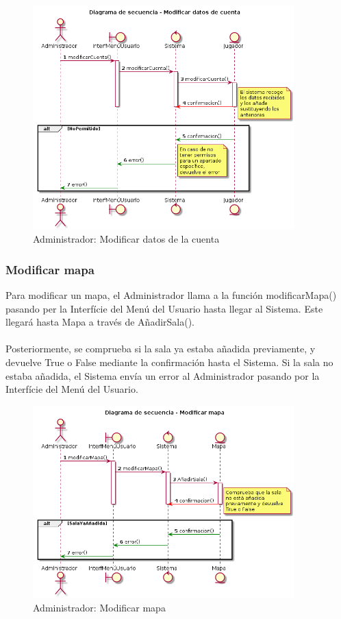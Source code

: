   \begin{figure} [ht]
	\centering
	\includegraphics[width=0.9\textwidth]{./imatges/administrador/Modificar_datos_de_cuenta.png}
	\caption{Administrador: Modificar datos de la cuenta}
\end{figure}
    

 \newpage 
\subsubsection{Modificar mapa}
  Para modificar un mapa, el Administrador llama a la función modificarMapa() pasando per la Interfície del Menú del Usuario hasta llegar al Sistema. Este llegará hasta Mapa a través de AñadirSala().\\
  \\Posteriormente, se comprueba si la sala ya estaba añadida previamente, y devuelve True o False mediante la confirmación hasta el Sistema. Si la sala no estaba añadida, el Sistema envía un error al Administrador pasando por la Interfície del Menú del Usuario.
  
    \begin{figure} [ht]
	\centering
	\includegraphics[width=0.9\textwidth]{./imatges/administrador/Modificar_mapa.png}
	\caption{Administrador: Modificar mapa}
\end{figure}
  
